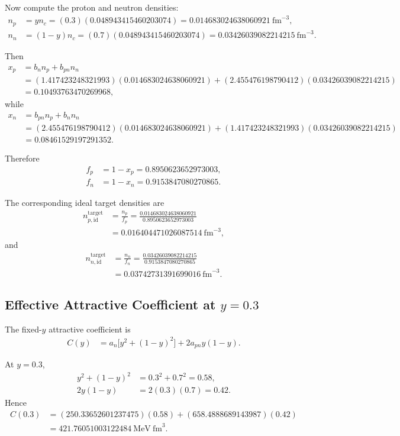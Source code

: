 \documentclass[11pt]{article}
\begin{document}
Now compute the proton and neutron densities:
\begin{align}
n_p &= yn_c = (0.3)(0.048943415460203074)
= 0.014683024638060921\ \mathrm{fm}^{-3}, \\
n_n &= (1-y)n_c = (0.7)(0.048943415460203074)
= 0.03426039082214215\ \mathrm{fm}^{-3}.
\end{align}

Then
\begin{align}
x_p
&=
b_n n_p + b_{pn} n_n \\
&=
(1.417423248321993)(0.014683024638060921)
+(2.455476198790412)(0.03426039082214215) \\
&=
0.10493763470269968,
\end{align}
while
\begin{align}
x_n
&=
b_{pn} n_p + b_n n_n \\
&=
(2.455476198790412)(0.014683024638060921)
+(1.417423248321993)(0.03426039082214215) \\
&=
0.08461529197291352.
\end{align}

Therefore
\begin{align}
f_p &= 1-x_p = 0.8950623652973003, \\
f_n &= 1-x_n = 0.9153847080270865.
\end{align}

The corresponding ideal target densities are
\begin{align}
n_{p,\mathrm{id}}^{\mathrm{target}}
&=
\frac{n_p}{f_p}
=
\frac{0.014683024638060921}{0.8950623652973003} \\
&=
0.016404471026087514\ \mathrm{fm}^{-3},
\end{align}
and
\begin{align}
n_{n,\mathrm{id}}^{\mathrm{target}}
&=
\frac{n_n}{f_n}
=
\frac{0.03426039082214215}{0.9153847080270865} \\
&=
0.03742731391699016\ \mathrm{fm}^{-3}.
\end{align}

\subsection{Effective Attractive Coefficient at \texorpdfstring{$y=0.3$}{y=0.3}}

The fixed-$y$ attractive coefficient is
\begin{align}
C(y)
&=
a_n\big[y^2+(1-y)^2\big]+2a_{pn}y(1-y).
\end{align}

At $y=0.3$,
\begin{align}
y^2+(1-y)^2 &= 0.3^2+0.7^2 = 0.58, \\
2y(1-y) &= 2(0.3)(0.7) = 0.42.
\end{align}
Hence
\begin{align}
C(0.3)
&=
(250.33652601237475)(0.58)
+(658.4888689143987)(0.42) \\
&=
421.76051003122484\ \mathrm{MeV\ fm}^3.
\end{align}
\end{document}
